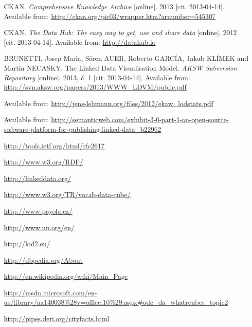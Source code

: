 \begin{thebibliography}{99}
 {\sc }
 CKAN. 
 \emph{Comprehensive Knowledge Archive}
 [online]. 2013
 [cit. 2013-04-14]. Available from: \url{http://ckan.org/pic03/wrapper.htm?arnumber=545307}

 {\sc }
CKAN.
 \emph{The Data Hub: The easy way to get, use and share data}
 [online]. 2012
 [cit. 2013-04-14]. Available from: \url{http://datahub.io}

 {\sc BRUNETTI,} Josep Maria, Sören AUER, Roberto GARCÍA, Jakub KLÍMEK and Martin NECASKY.
 The Linked Data Visualisation Model.
 \emph{AKSW Subversion Repository} [online]. 2013, č. 1 [cit. 2013-04-14].
 Available from: \url{http://svn.aksw.org/papers/2013/WWW_LDVM/public.pdf}

Available from: \url{http://jens-lehmann.org/files/2012/ekaw_lodstats.pdf}

Available from: \url{http://semanticweb.com/exhibit-3-0-part-1-an-open-source-software-platform-for-publishing-linked-data_b22962}

\url{http://tools.ietf.org/html/rfc2617}

\url{http://www.w3.org/RDF/}

\url{http://linkeddata.org/}

\url{http://www.w3.org/TR/vocab-data-cube/}

\url{http://www.payola.cz/}

\url{http://www.un.org/en/}

\url{http://lod2.eu/}

\url{http://dbpedia.org/About}

\url{http://en.wikipedia.org/wiki/Main_Page}

\url{http://msdn.microsoft.com/en-us/library/aa140038%28v=office.10%29.aspx#odc_da_whatrcubes_topic2}

\url{http://pipes.deri.org/cityfacts.html}

\end{thebibliography}
